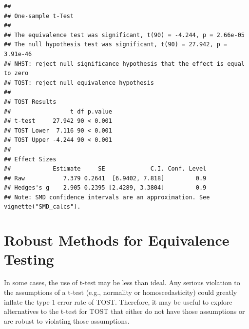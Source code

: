 \documentclass[]{interact}
\theoremstyle{plain}%
\theoremstyle{definition}
\theoremstyle{remark}
\newenvironment{Shaded}{\begin{snugshade}}{\end{snugshade}}
\newcommand{\AttributeTok}[1]{\textcolor[rgb]{0.77,0.63,0.00}{#1}}
\newcommand{\ConstantTok}[1]{\textcolor[rgb]{0.00,0.00,0.00}{#1}}
\newcommand{\FloatTok}[1]{\textcolor[rgb]{0.00,0.00,0.81}{#1}}
\newcommand{\FunctionTok}[1]{\textcolor[rgb]{0.00,0.00,0.00}{#1}}
\newcommand{\NormalTok}[1]{#1}
\newcommand{\OtherTok}[1]{\textcolor[rgb]{0.56,0.35,0.01}{#1}}
\newcommand{\SpecialCharTok}[1]{\textcolor[rgb]{0.00,0.00,0.00}{#1}}
\newcommand{\StringTok}[1]{\textcolor[rgb]{0.31,0.60,0.02}{#1}}
\begin{document}
\begin{Shaded}
\end{Shaded}

\begin{verbatim}
## 
## One-sample t-Test
## 
## The equivalence test was significant, t(90) = -4.244, p = 2.66e-05
## The null hypothesis test was significant, t(90) = 27.942, p = 3.91e-46
## NHST: reject null significance hypothesis that the effect is equal to zero 
## TOST: reject null equivalence hypothesis
## 
## TOST Results 
##                 t df p.value
## t-test     27.942 90 < 0.001
## TOST Lower  7.116 90 < 0.001
## TOST Upper -4.244 90 < 0.001
## 
## Effect Sizes 
##            Estimate     SE             C.I. Conf. Level
## Raw           7.379 0.2641  [6.9402, 7.818]         0.9
## Hedges's g    2.905 0.2395 [2.4289, 3.3804]         0.9
## Note: SMD confidence intervals are an approximation. See vignette("SMD_calcs").
\end{verbatim}

\newpage

\hypertarget{robust-methods-for-equivalence-testing}{%
\section{Robust Methods for Equivalence
Testing}\label{robust-methods-for-equivalence-testing}}

In some cases, the use of t-test may be less than ideal. Any serious
violation to the assumptions of a t-test (e.g., normality or
homoscedasticity) could greatly inflate the type 1 error rate of TOST.
Therefore, it may be useful to explore alternatives to the t-test for
TOST that either do not have those assumptions or are robust to
violating those assumptions.
\end{document}
